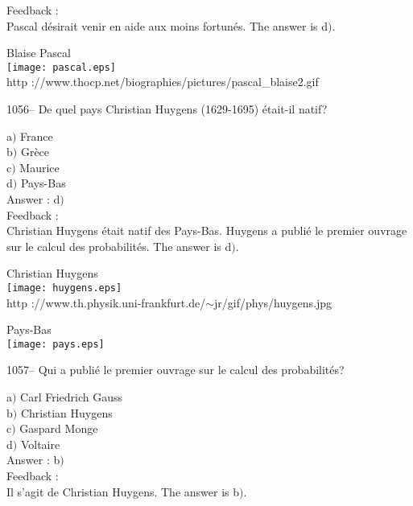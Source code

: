 ﻿\documentclass[letterpaper, 12pt]{article}
\begin{document}
Feedback : \\
Pascal d\'esirait venir en aide aux moins fortun\'es.
The answer is d$)$.\\

        \begin{center}
        Blaise Pascal\\
    \texttt{[image: pascal.eps]}\\
        {\footnotesize http
://www.thocp.net/biographies/pictures/pascal\_blaise2.gif}
    \end{center}

1056-- De quel pays Christian Huygens (1629-1695) \'etait-il natif?

a$)$ France \\
b$)$ Gr\`ece  \\
c$)$ Maurice  \\
d$)$ Pays-Bas \\

Answer : d$)$\\

Feedback : \\
Christian Huygens \'etait natif des Pays-Bas. Huygens a publi\'e le
premier ouvrage sur le calcul des probabilit\'es.
The answer is d$)$.\\

        \begin{center}
        Christian Huygens\\
    \texttt{[image: huygens.eps]}\\
        {\footnotesize http
://www.th.physik.uni-frankfurt.de/$\sim$jr/gif/phys/huygens.jpg}
    \end{center}

        \begin{center}
        Pays-Bas\\
    \texttt{[image: pays.eps]}\\
    \end{center}

1057-- Qui a publi\'e le premier ouvrage sur le calcul des
probabilit\'es?

a$)$ Carl Friedrich Gauss \\
b$)$ Christian Huygens \\
c$)$ Gaspard Monge  \\
d$)$ Voltaire  \\

Answer : b$)$\\

Feedback : \\
Il s'agit de Christian Huygens.
The answer is b$)$.\\
\end{document}
